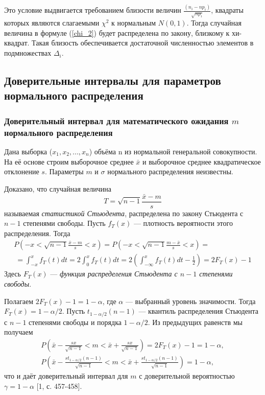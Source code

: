 \documentclass[12pt]{article}
\begin{document}
	Это условие выдвигается требованием близости величин $\frac{(n_{i} -np_{i})}{\sqrt{np_{i}}}$, квадраты которых являются слагаемыми $\chi^{2}$  к нормальным $N(0,1)$. Тогда случайная величина в формуле (\ref{chi_2}) будет распределена по закону, близкому к хи-квадрат. Такая близость обеспечивается достаточной численностью элементов в подмножествах $\Delta_{i}$.
	\subsection{Доверительные интервалы для параметров нормального распределения}
	\subsubsection{Доверительный интервал для математического ожидания $m$ нормального распределения}
	Дана выборка ($x_{1},x_{2}, ... ,x_{n}$) объёма n из нормальной генеральной совокупности. На её основе строим выборочное среднее $\bar{x}$ и выборочное среднее квадратическое отклонение $s$. Параметры $m$ и $\sigma$ нормального распределения неизвестны.

	Доказано, что случайная величина
	\begin{equation}
		T = \sqrt{n - 1}\frac{\bar{x} - m}{s}
		\label{T}
	\end{equation}
	называемая \textit{статистикой Стьюдента}, распределена по закону Стьюдента с $n-1$ степенями свободы. Пусть $f_{T}(x)$ — плотность вероятности этого распределения. Тогда 
	\begin{multline}
		P\left(-x < \sqrt{n - 1}\frac{\bar{x} - m}{s} < x \right) = 
		P\left(-x < \sqrt{n - 1}\frac{m - \bar{x}}{s} < x \right) = \\\
		= \int_{-x}^{x}{f_{T}(t)d t} = 2 \int_{0}^{x}{f_{T}(t)d t} = 
		2\left(  \int_{-\infty}^{x}{f_{T}(t)d t} - \frac{1}{2} \right) = 2F_{T}(x) - 1
		\label{P_f_t}
	\end{multline}
	Здесь $F_{T}(x)$ — \textit{функция распределения Стьюдента с $n-1$ степенями свободы}.

	Полагаем $2F_{T}(x)-1 = 1-\alpha$, где $\alpha$ — выбранный уровень значимости. Тогда $F_{T}(x) = 1-\alpha/2$. Пусть $t_{1-\alpha/2}(n-1)$ — квантиль распределения Стьюдента с $n-1$ степенями свободы и порядка $1-\alpha/2$. Из предыдущих равенств мы получаем 
	\begin{equation}
		\begin{gathered} \label{P_m}
			P\left(\bar{x} - \frac{sx}{\sqrt{n-1}} < m <  \bar{x} + \frac{sx}{\sqrt{n-1}}\right) = 2F_{T}(x) -1 = 1 -\alpha,  \\
			P\left(\bar{x} - \frac{st_{1-\alpha/2}(n-1)}{\sqrt{n-1}} < m <  \bar{x} + \frac{st_{1-\alpha/2}(n-1)}{\sqrt{n-1}}\right)= 1  -\alpha,
		\end{gathered}
	\end{equation}
	что и даёт доверительный интервал для $m$ с доверительной вероятностью $\gamma = 1-\alpha$ [1, с. 457-458].
	
\end{document}
